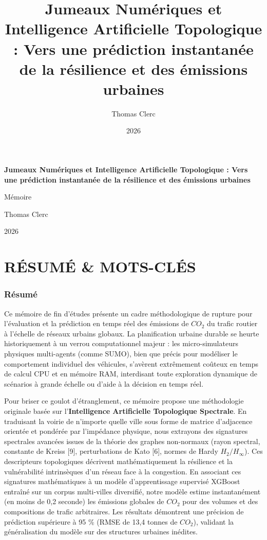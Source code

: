 \documentclass[10pt, a4paper]{article}
\title{Jumeaux Numériques et Intelligence Artificielle Topologique :
Vers une prédiction instantanée de la résilience et des émissions
urbaines}
\author{Thomas Clerc}
\date{2026}
\begin{document}
\begin{titlepage}
\centering
\vspace*{2cm}
{\Huge\bfseries Jumeaux Numériques et Intelligence Artificielle
Topologique : Vers une prédiction instantanée de la résilience et des
émissions urbaines\par}
\vspace{1.5cm}
{\Large Mémoire\par}
\vspace{1cm}
{\large Thomas Clerc\par}
\vspace{0.5cm}
{\large 2026\par}
\vfill
\end{titlepage}

\tableofcontents
\newpage

\section{RÉSUMÉ \& MOTS-CLÉS}\label{ruxe9sumuxe9-mots-cluxe9s}

\subsubsection{Résumé}\label{ruxe9sumuxe9}

Ce mémoire de fin d'études présente un cadre méthodologique de rupture
pour l'évaluation et la prédiction en temps réel des émissions de
\(CO_2\) du trafic routier à l'échelle de réseaux urbains globaux. La
planification urbaine durable se heurte historiquement à un verrou
computationnel majeur : les micro-simulateurs physiques multi-agents
(comme SUMO), bien que précis pour modéliser le comportement individuel
des véhicules, s'avèrent extrêmement coûteux en temps de calcul CPU et
en mémoire RAM, interdisant toute exploration dynamique de scénarios à
grande échelle ou d'aide à la décision en temps réel.

Pour briser ce goulot d'étranglement, ce mémoire propose une
méthodologie originale basée sur l'\textbf{Intelligence Artificielle
Topologique Spectrale}. En traduisant la voirie de n'importe quelle
ville sous forme de matrice d'adjacence orientée et pondérée par
l'impédance physique, nous extrayons des signatures spectrales avancées
issues de la théorie des graphes non-normaux (rayon spectral, constante
de Kreiss {[}9{]}, perturbations de Kato {[}6{]}, normes de Hardy
\(H_2/H_\infty\)). Ces descripteurs topologiques décrivent
mathématiquement la résilience et la vulnérabilité intrinsèques d'un
réseau face à la congestion. En associant ces signatures mathématiques à
un modèle d'apprentissage supervisé XGBoost entraîné sur un corpus
multi-villes diversifié, notre modèle estime instantanément (en moins de
0,2 seconde) les émissions globales de \(CO_2\) pour des volumes et des
compositions de trafic arbitraires. Les résultats démontrent une
précision de prédiction supérieure à 95 \% (RMSE de 13,4 tonnes de
\(CO_2\)), validant la généralisation du modèle sur des structures
urbaines inédites.
\end{document}
